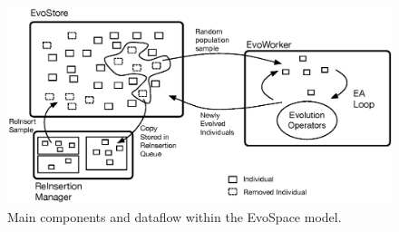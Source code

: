 
\begin{figure}[t]
    \centering
        \includegraphics[width=12cm]{evospaceExample.eps}
    \caption{Main components and dataflow within the EvoSpace model.}
    \label{fig:evo}
\end{figure}

